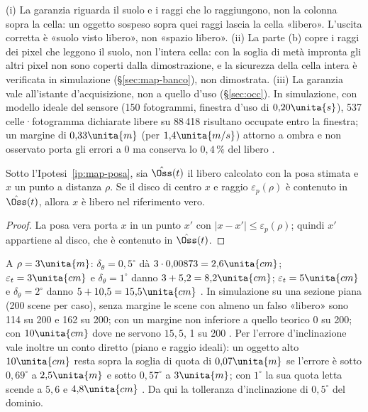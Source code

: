 \begin{osservazione}\label{oss:map-nondice}
(i) La garanzia riguarda il suolo e i raggi che lo raggiungono, non la colonna sopra la cella: un oggetto sospeso sopra quei raggi lascia la cella «libero». L'uscita corretta è «suolo visto libero», non «spazio libero». (ii) La parte (b) copre i raggi dei pixel che leggono il suolo, non l'intera cella: con la soglia di metà impronta gli altri pixel non sono coperti dalla dimostrazione, e la sicurezza della cella intera è verificata in simulazione (\S\ref{sec:map-banco}), non dimostrata. (iii) La garanzia vale all'istante d'acquisizione, non a quello d'uso (\S\ref{sec:occ}). In simulazione, con modello ideale del sensore (150 fotogrammi, finestra d'uso di $0{,}20\unita{s}$), 537 celle·fotogramma dichiarate libere su 88\,418 risultano occupate entro la finestra; un margine di $0{,}33\unita{m}$ (per $1{,}4\unita{m/s}$) attorno a ombra e non osservato porta gli errori a 0 ma conserva lo $0{,}4\,\%$ del libero .
\end{osservazione}

\begin{lemma}\label{lem:map-posa}
Sotto l'Ipotesi~\ref{ip:map-posa}, sia $\hat{\Oss}(t)$ il libero calcolato con la posa stimata e $x$ un punto a distanza $\rho$. Se il disco di centro $x$ e raggio $\varepsilon_p(\rho)$ è contenuto in $\hat{\Oss}(t)$, allora $x$ è libero nel riferimento vero.
\end{lemma}
\begin{proof} La posa vera porta $x$ in un punto $x'$ con $|x-x'|\le\varepsilon_p(\rho)$; quindi $x'$ appartiene al disco, che è contenuto in $\hat{\Oss}(t)$.\end{proof}
A $\rho=3\unita{m}$: $\delta_\theta=0{,}5^\circ$ dà $3\cdot0{,}00873=2{,}6\unita{cm}$; $\varepsilon_t=3\unita{cm}$ e $\delta_\theta=1^\circ$ danno $3+5{,}2=8{,}2\unita{cm}$; $\varepsilon_t=5\unita{cm}$ e $\delta_\theta=2^\circ$ danno $5+10{,}5=15{,}5\unita{cm}$ . In simulazione su una sezione piana (200 scene per caso), senza margine le scene con almeno un falso «libero» sono 114 su 200 e 162 su 200; con un margine non inferiore a quello teorico 0 su 200; con $10\unita{cm}$ dove ne servono $15{,}5$, 1 su 200 . Per l'errore d'inclinazione vale inoltre un conto diretto (piano e raggio ideali): un oggetto alto $10\unita{cm}$ resta sopra la soglia di quota di $0{,}07\unita{m}$ se l'errore è sotto $0{,}69^\circ$ a $2{,}5\unita{m}$ e sotto $0{,}57^\circ$ a $3\unita{m}$; con $1^\circ$ la sua quota letta scende a $5{,}6$ e $4{,}8\unita{cm}$ . Da qui la tolleranza d'inclinazione di $0{,}5^\circ$ del dominio.

